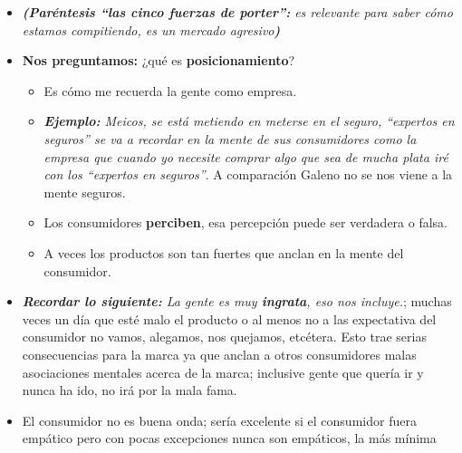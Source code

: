\begin{itemize}
    \item \emph{\textbf{(Paréntesis ``las cinco fuerzas de porter'':} es relevante para saber cómo estamos compitiendo, es un mercado agresivo\textbf{)}}
    \item \textbf{Nos preguntamos:} ¿qué es \textbf{posicionamiento}?
        \begin{itemize}
            \item Es cómo me recuerda la gente como empresa.
            \item \emph{\textbf{Ejemplo: }Meicos, se está metiendo en meterse en el seguro, ``expertos en seguros'' se va a recordar en la mente de sus consumidores como la empresa que cuando yo necesite comprar algo que sea de mucha plata iré con los ``expertos en seguros''}. A comparación Galeno no se nos viene a la mente seguros.
            \item Los consumidores \textbf{perciben}, esa percepción puede ser verdadera o falsa. 
            \item A veces los productos son tan fuertes que anclan en la mente del consumidor.
        \end{itemize}
    
    \item \emph{\textbf{Recordar lo siguiente: }La gente es muy \textbf{ingrata}, eso nos incluye.}; muchas veces un día que esté malo el producto o al menos no a las expectativa del consumidor no vamos, alegamos, nos quejamos, etcétera. Esto trae serias consecuencias para la marca ya que anclan a otros consumidores malas asociaciones mentales acerca de la marca; inclusive gente que quería ir y nunca ha ido, no irá por la mala fama.
    \item El consumidor no es buena onda; sería excelente si el consumidor fuera empático pero con pocas excepciones nunca son empáticos, la más mínima 
\end{itemize}
